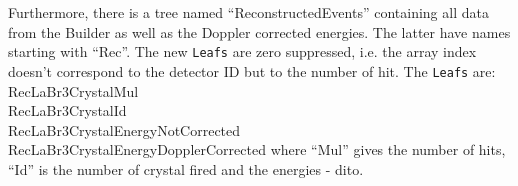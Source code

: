 \documentclass[12pt]{book}
\begin{document}
Furthermore, there is a tree named ``ReconstructedEvents'' containing all data from the Builder as well as the Doppler corrected energies. The latter have names starting with ``Rec''. The new \texttt{Leafs} are zero suppressed, i.e. the array index doesn't correspond to the detector ID but to the number of hit. The \texttt{Leafs} are:\hfill{}
\linebreak
{\ttfamily RecLaBr3CrystalMul\\
RecLaBr3CrystalId\\
RecLaBr3CrystalEnergyNotCorrected\\
RecLaBr3CrystalEnergyDopplerCorrected}
\linebreak
where ``Mul'' gives the number of hits, ``Id'' is the number of crystal fired and the energies - dito.\\
\end{document}
